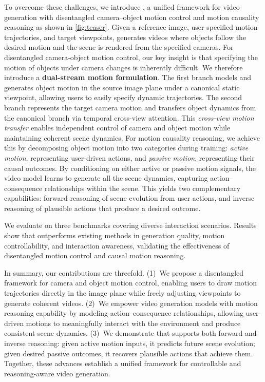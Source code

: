 To overcome these challenges, we introduce \ours, a unified framework for video generation with disentangled camera–object motion control and motion causality reasoning as shown in \cref{fig:teaser}.
Given a reference image, user-specified motion trajectories, and target viewpoints, \ours generates videos where objects follow the desired motion and the scene is rendered from the specified cameras.
For disentangled camera-object motion control, our key insight is that specifying the motion of objects under camera changes is inherently difficult. We therefore introduce a \textbf{dual-stream motion formulation}. The first branch models and generates object motion in the source image plane under a canonical static viewpoint, allowing users to easily specify dynamic trajectories. The second branch represents the target camera motion and transfers object dynamics from the canonical branch via temporal cross-view attention. This \emph{cross-view motion transfer} enables independent control of camera and object motion while maintaining coherent scene dynamics.
For motion causality reasoning,
we achieve this by decomposing object motion into two categories during training: \emph{active motion}, representing user-driven actions, and \emph{passive motion}, representing their causal outcomes. By conditioning on either active or passive motion signals, the video model learns to generate all the scene dynamics, capturing action--consequence relationships within the scene. This yields two complementary capabilities: forward reasoning of scene evolution from user actions, and inverse reasoning of plausible actions that produce a desired outcome.

We evaluate \ours on three benchmarks covering diverse interaction scenarios. Results show that \ours outperforms existing methods in generation quality, motion controllability, and interaction awareness, validating the effectiveness of disentangled motion control and causal motion reasoning.

In summary, our contributions are threefold.
(1)~We propose a disentangled framework for camera and object motion control, enabling users to draw motion trajectories directly in the image plane while freely adjusting viewpoints to generate coherent videos.
(2)~We empower video generation models with motion reasoning capability by modeling action--consequence relationships, allowing user-driven motions to meaningfully interact with the environment and produce consistent scene dynamics.
(3)~We demonstrate that \ours supports both forward and inverse reasoning: given active motion inputs, it predicts future scene evolution; given desired passive outcomes, it recovers plausible actions that achieve them. Together, these advances establish a unified framework for controllable and reasoning-aware video generation.
